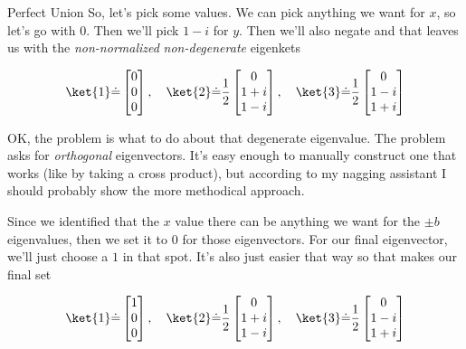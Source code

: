 \begin{answer}
\begin{answerpart}{Perfect Union}
    So, let's pick some values.  We can pick anything we want for $x$,
    so let's go with $0$.  Then we'll pick $1-i$ for $y$.  Then we'll
    also negate and that leaves us with the \emph{non-normalized}
    \emph{non-degenerate} eigenkets

    \begin{equation}
      \ket{1} \dot{=}
      \begin{bmatrix}
        0\\ 0\\ 0\\
      \end{bmatrix}
      ,\quad
      \ket{2} \dot{=}
      \frac{1}{2}
      \begin{bmatrix}
        0\\ 1+i\\ 1-i\\
      \end{bmatrix}
      ,\quad
      \ket{3} \dot{=}
      \frac{1}{2}
      \begin{bmatrix}
        0\\ 1-i\\ 1+i\\
      \end{bmatrix}
    \end{equation}

    OK, the problem is what to do about that degenerate eigenvalue.
    The problem asks for \emph{orthogonal} eigenvectors.  It's easy
    enough to manually construct one that works (like by taking a
    cross product), but according to my nagging assistant I should
    probably show the more methodical approach.

    Since we identified that the $x$ value there can be anything we
    want for the $\pm b$ eigenvalues, then we set it to 0 for those
    eigenvectors.  For our final eigenvector, we'll just choose a $1$
    in that spot.  It's also just easier that way so that makes our
    final set

    \begin{equation}
      \ket{1} \dot{=}
      \begin{bmatrix}
        1\\ 0\\ 0\\
      \end{bmatrix}
      ,\quad
      \ket{2} \dot{=}
      \frac{1}{2}
      \begin{bmatrix}
        0\\ 1+i\\ 1-i\\
      \end{bmatrix}
      ,\quad
      \ket{3} \dot{=}
      \frac{1}{2}
      \begin{bmatrix}
        0\\ 1-i\\ 1+i\\
      \end{bmatrix}
    \end{equation}


\end{answerpart}
\end{answer}
